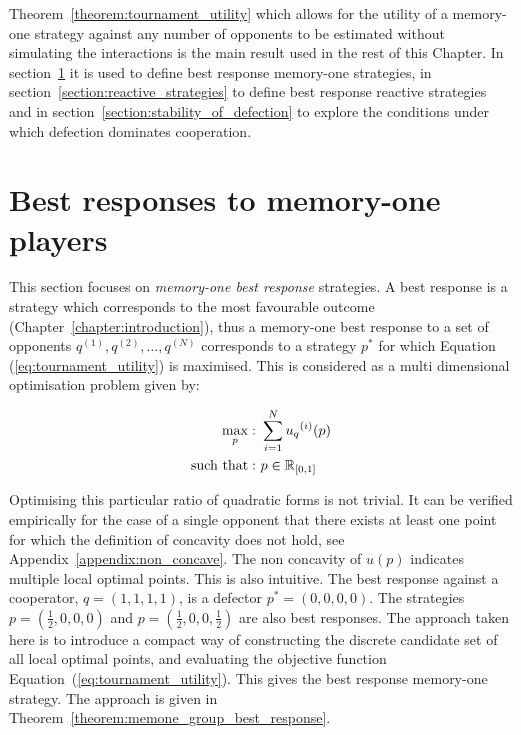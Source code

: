Theorem~\ref{theorem:tournament_utility} which allows for the utility of a
memory-one strategy against any number of opponents to be estimated without
simulating the interactions is the main result used in the rest of this Chapter. In
section~\ref{section:best_response_mem_one} it is used to define best response
memory-one strategies, in section~\ref{section:reactive_strategies} to define best response
reactive strategies and in section~\ref{section:stability_of_defection}
to explore the conditions under which defection dominates cooperation.

\section{Best responses to memory-one players}\label{section:best_response_mem_one}

This section focuses on \textit{memory-one
best response} strategies. A best response is a strategy which
corresponds to the most favourable outcome (Chapter~\ref{chapter:introduction}), thus a memory-one
best response to a set of opponents \(q^{(1)}, q^{(2)}, \dots, q^{(N)}\) corresponds to a strategy \(p^*\) for which
Equation (\ref{eq:tournament_utility}) is maximised. This is considered as a multi
dimensional optimisation problem given by:

\begin{equation}\label{eq:mo_tournament_optimisation}
    \begin{aligned}
    \max_p: & \ \sum_{i=1} ^ {N} {u_q}^{(i)} (p)
    \\
    \text{such that}: & \ p \in \mathbb{R}_{[0, 1]}
    \end{aligned}
\end{equation}

Optimising this particular ratio of quadratic forms is not trivial. It can be
verified empirically for the case of a single opponent that there exists at
least one point for which the definition of concavity does not hold, see Appendix~\ref{appendix:non_concave}.
The non concavity of \(u(p)\) indicates multiple local
optimal points. This is also intuitive. The best response against a cooperator,
\(q=(1, 1, 1, 1)\), is a defector \(p^*=(0, 0, 0, 0)\). The strategies
\(p=(\frac{1}{2}, 0, 0, 0)\) and \(p=(\frac{1}{2}, 0, 0, \frac{1}{2})\) are also
best responses. The approach taken here is to introduce a compact way of
constructing the discrete candidate set of all local optimal points, and evaluating
the objective function Equation~(\ref{eq:tournament_utility}). This gives the best
response memory-one strategy. The approach is given in
Theorem~\ref{theorem:memone_group_best_response}.

